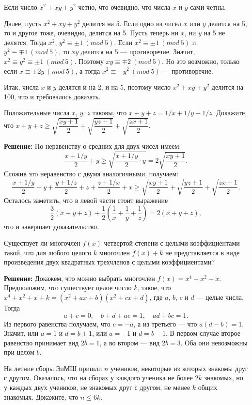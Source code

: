 Если число $x^2+xy+y^2$ четно, что очевидно, что числа $x$ и $y$ сами четны.

Далее, пусть $x^2+xy+y^2$ делится на 5. Если одно из чисел $x$ или $y$ делится на 5, то и другое тоже, очевидно, делится на 5. Пусть теперь ни $x$, ни $y$ на 5 не делятся. Тогда $x^2$, $y^2\equiv \pm 1 \ (mod \ 5)$. Если $x^2\equiv \pm 1 \ (mod \ 5)$ и $y^2\equiv \mp 1 \ (mod \ 5)$, то $xy$ делится на 5 --- противоречие. Значит, $x^2\equiv y^2\equiv \pm 1 \ (mod \ 5)$. Поэтому $xy\equiv \mp 2\ (mod \ 5)$. Но это возможно, только если $x\equiv \pm 2y \ (mod \ 5)$, а тогда $x^2\equiv -y^2 \ (mod \ 5)$ --- противоречие.

Итак, числа $x$ и $y$ делятся и на 2, и на 5, поэтому число $x^2+xy+y^2$ делится на 100, что и требовалось доказать.

Положительные числа $x$, $y$, $z$ таковы, что $x+y+z=1/x+1/y+1/z$. Докажите, что $x+y+z\geq\sqrt{\dfrac{xy+1}{2}}+\sqrt{\dfrac{yz+1}{2}}+\sqrt{\dfrac{zx+1}{2}}$.

\textbf{Решение:}
По неравенству о средних для двух чисел имеем: $$\frac{x+1/y}{2}+y\geq \sqrt{\frac{x+1/y}{2}\cdot y}=2\sqrt{\frac{xy+1}{2}}.$$ Сложив это неравенство с двумя аналогичными, получаем: $$\frac{x+1/y}{2}+y+\frac{y+1/z}{2}+z+\frac{z+1/x}{2}+x\geq \sqrt{\dfrac{xy+1}{2}}+\sqrt{\dfrac{yz+1}{2}}+\sqrt{\dfrac{zx+1}{2}}.$$
Осталось заметить, что в левой части стоит выражение $$\frac 3 2 (x+y+z)+\frac 1 2 (\frac 1 x+\frac 1 y+\frac 1 z)=2(x+y+z),$$
что и завершает доказательство.

Существует ли многочлен $f(x)$ четвертой степени с целыми коэффициентами такой, что для любого целого $k$ многочлен $f(x)+k$ не представляется в виде произведения двух квадратных трехчленов с целыми коэффициентами?

\textbf{Решение:}
Докажем, что можно выбрать многочлен $f(x)=x^4+x^2+x$. Предположим, что существует целое число $k$, такое, что $x^4+x^2+x+k=(x^2+ax+b)(x^2+cx+d)$, где $a$, $b$, $c$ и $d$ --- целые числа. Тогда $$a+c=0, \quad b+d+ac=1,\quad ad+bc=1.$$ Из первого равенства получаем, что $c=-a$, а из третьего --- что $a(d-b)=1$. Значит, или $a=1$ и $d=b+1$, или $a=-1$ и $d=b-1$. В первом случае второе равенство принимает вид $2b=1$, а во втором --- вид $2b=3$. Оба они невозможны при целом $b$.

На летние сборы ЭлМШ пришли $n$ учеников, некоторые из которых знакомы друг с другом. Оказалось, что на сборах у каждого ученика не более $2k$ знакомых, но у каждых двух учеников, не знакомых друг с другом, не менее $k$ общих знакомых. Докажите, что $n \leq 6k$.

